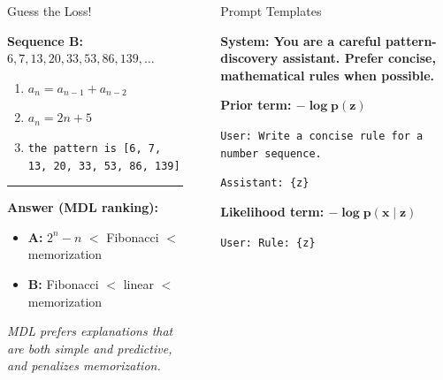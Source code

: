 \documentclass[final]{beamer}
\newlength{\sepwidth}
\newlength{\colwidth}
\newcommand{\separatorcolumn}{\begin{column}{\sepwidth}\end{column}}
\begin{document}
\begin{frame}[t]
\begin{columns}[t]
\begin{column}{\colwidth}
\begin{block}{Guess the Loss!}
\vspace{0.5em}

\textbf{Sequence B:} \\
$6, 7, 13, 20, 33, 53, 86, 139, \dots$

\begin{enumerate}
  \item $a_n = a_{n-1} + a_{n-2}$
  \item $a_n = 2n + 5$
  \item \texttt{the pattern is [6, 7, 13, 20, 33, 53, 86, 139]}
\end{enumerate}

\vspace{0.6em}
\hrule
\vspace{0.4em}

\textbf{Answer (MDL ranking):}

\begin{itemize}
  \item \textbf{A:} $2^n - n$ $<$ Fibonacci $<$ memorization
  \item \textbf{B:} Fibonacci $<$ linear $<$ memorization
\end{itemize}

\textit{MDL prefers explanations that are both simple and predictive,
and penalizes memorization.}

\end{block}

\end{column}

\separatorcolumn

\begin{column}{\colwidth}

\begin{exampleblock}{Prompt Templates}

  \textbf{System: You are a careful pattern-discovery assistant. 
  Prefer concise, mathematical rules when possible.}

  \vspace{0.5em}

  \textbf{Prior term: $\boldsymbol{-\log p(z)}$}

  \smallskip
  \noindent
  \texttt{User: Write a concise rule for a number sequence.}

  \noindent
  \texttt{Assistant: \{z\}}

  \vspace{0.6em}

  \textbf{Likelihood term: $\boldsymbol{-\log p(x \mid z)}$}

  \smallskip
  \noindent
  \texttt{User: Rule: \{z\}}


\end{exampleblock}
\end{column}
\end{columns}
\end{frame}
\end{document}

